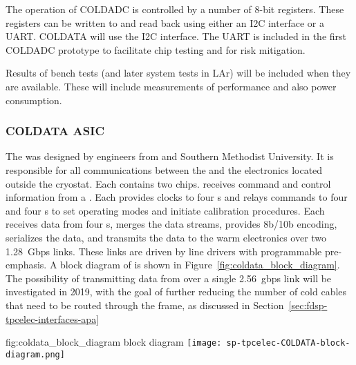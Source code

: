 The operation of COLDADC is controlled by a number of 8-bit registers.  These registers can be written to and read back using either an I2C interface or a UART.  COLDATA will use the I2C interface.  The UART is included in the first COLDADC prototype to facilitate chip testing and for risk mitigation.

Results of bench tests (and later system tests in LAr) will be included when they are available.  These will include measurements of performance and also power consumption.

\subsubsection{COLDATA ASIC}
\label{sec:fdsp-tpcelec-design-femb-coldata}

The   was designed by engineers from  
and Southern Methodist University. It is responsible for all communications 
between the  and the electronics located outside the cryostat. 
Each  contains two  chips.  receives 
command and control information from a . Each  provides 
clocks to four s and relays commands to four  
  and four s to set operating modes and 
initiate calibration procedures.  Each  receives data from four 
s, merges the data streams, provides 8b/10b encoding, serializes 
the data, and transmits the data to the warm electronics over two \SI{1.28}{Gbps} 
links.  These links are driven by line drivers with programmable pre-emphasis. 
A block diagram of  is shown in Figure~\ref{fig:coldata_block_diagram}.
The possibility of transmitting data from  over a single 
\SI{2.56}{gbps} link will be investigated in 2019, with the goal of further
reducing the number of cold cables that need to be routed through the
 frame, as discussed in Section~\ref{sec:fdsp-tpcelec-interfaces-apa}

\begin{dunefigure}
{fig:coldata_block_diagram}
{ block diagram}
\texttt{[image: sp-tpcelec-COLDATA-block-diagram.png]}
\end{dunefigure}

